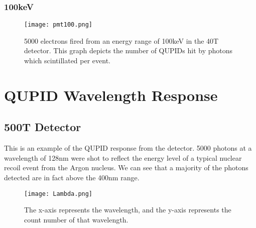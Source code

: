 \documentclass[11pt,a4paper,oneside]{report}
\begin{document}
\newpage
\subsubsection{100keV}
\begin{figure}[htb]
\centering
\texttt{[image: pmt100.png]}
\caption{5000 electrons fired from an energy range of 100keV in the 40T detector. This graph depicts the number of QUPIDs hit by photons which scintillated per event.}
\end{figure}

\newpage
\section{QUPID Wavelength Response}
\subsection{500T Detector}
This is an example of the QUPID response from the detector. 5000 photons at a wavelength of 128nm were shot to reflect the energy level of a typical nuclear recoil event from the Argon nucleus. We can see that a majority of the photons detected are in fact above the 400nm range.

\begin{figure}[htb]
\centering
\texttt{[image: Lambda.png]}
\caption{The x-axis represents the wavelength, and the y-axis represents the count number of that wavelength.}
\end{figure}
\end{document}
